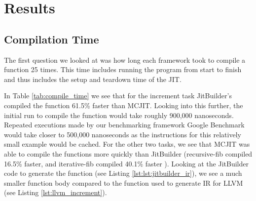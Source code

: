 \section{Results}
\label{sec:results}
\subsection{Compilation Time}
The first question we looked at was how long each framework took to compile a function 25 times. This time includes running the program from start to finish and thus includes the setup and teardown time of the JIT.

In Table \ref{tab:compile_time} we see that for the increment task JitBuilder's compiled the function 61.5\% faster than MCJIT.
Looking into this further, the initial run to compile the function would take roughly 900,000 nanoseconds.
Repeated executions made by our benchmarking framework Google Benchmark\cite{googleBench} would take closer to 500,000 nanoseconds as the instructions for this relatively small example would be cached.
For the other two tasks, we see that MCJIT was able to compile the functions more quickly than JitBuilder (recursive-fib compiled 16.5\% faster, and iterative-fib compiled 40.1\% faster ).
Looking at the JitBuilder code to generate the function (see Listing \ref{lst:lst:jitbuilder_ir}), we see a much smaller function body compared to the function used to generate IR for LLVM (see Listing \ref{lst:llvm_increment}).


